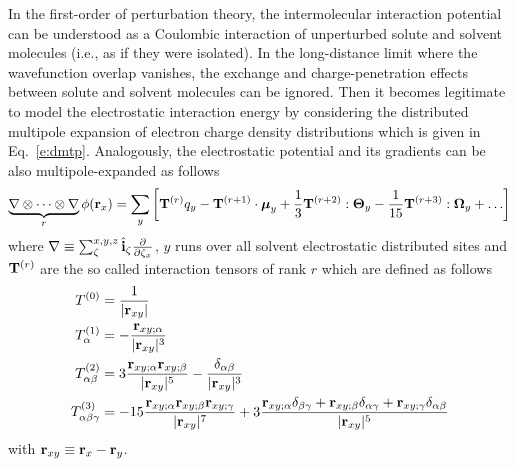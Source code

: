 \documentclass[a4paper,titlepage,twoside,fleqn,12pt]{book}
\newcommand{\BM}[1]{\ensuremath{\mbox{\boldmath${#1}$}}}
\begin{document}
\begin{refsection}
In the first\hyp{}order of perturbation
theory, the intermolecular interaction potential
can be understood as a Coulombic interaction
of unperturbed solute and solvent molecules (i.e., 
as if they were isolated).\citep{Jeziorski.Moszynski.Szalewicz.ChemRev.1994,Stone.TheTheoryOfIntermolecularForces.1996}
In the long\hyp{}distance limit where the wavefunction overlap vanishes, the
exchange and charge\hyp{}penetration effects 
between solute and solvent molecules can be ignored.
Then it becomes legitimate to model the electrostatic interaction
energy by considering the distributed multipole expansion of electron
charge density distributions\citep{Stone.TheTheoryOfIntermolecularForces.1996}
which is given in Eq.~\eqref{e:dmtp}. Analogously,
the electrostatic potential and its gradients
can be also multipole\hyp{}expanded as follows
%
\begin{equation} \label{e:potential-gradients}
\underbrace{\nabla \otimes \cdots \otimes \nabla}_{r} \phi({\bf r}_x) = 
\sum_y \left[ 
{\bf T}^{(r)} q_y - {\bf T}^{(r+1)} \cdot {\BM \mu}_y + 
 \frac{1}{3} {\bf T}^{(r+2)} : {\BM \Theta}_y - 
\frac{1}{15} {\bf T}^{(r+3)} : {\BM \Omega}_y + \ldots
\right]
\end{equation}
%
where 
$\nabla \equiv \sum_{\zeta}^{x,y,z} \hat{\bf i}_\zeta \frac{\partial}{\partial \zeta_x}$, 
$y$ runs over all solvent electrostatic distributed sites
and ${\bf T}^{(r)}$ are the so called interaction tensors of rank $r$ which are defined as follows
%
\begin{subequations}
\label{e:interaction-tensors}
\begin{align}
  T^{(0)} &= \frac{1}{\rvert {\bf r}_{xy} \lvert}  \label{e:interaction-tensors-1} \\
  T^{(1)}_\alpha &=-\frac{{\bf r}_{xy;\alpha}}{\rvert {\bf r}_{xy} \lvert^3}  \label{e:interaction-tensors-2} \\
  T^{(2)}_{\alpha\beta} &=3\frac{{\bf r}_{xy;\alpha} {\bf r}_{xy;\beta} }{\rvert {\bf r}_{xy} \lvert^5}  
      - \frac{\delta_{\alpha\beta}}{\rvert {\bf r}_{xy} \lvert^3}             \label{e:interaction-tensors-3} \\
  T^{(3)}_{\alpha\beta\gamma} &= -15 
         \frac{{\bf r}_{xy;\alpha} {\bf r}_{xy;\beta} {\bf r}_{xy;\gamma} }{\rvert {\bf r}_{xy} \lvert^7}
                  +3 \frac{{\bf r}_{xy;\alpha} \delta_{\beta\gamma}+
                           {\bf r}_{xy;\beta}  \delta_{\alpha\gamma}+
                           {\bf r}_{xy;\gamma} \delta_{\alpha\beta}}{\rvert {\bf r}_{xy} \lvert^5} \label{e:interaction-tensors-4}
\end{align}
\end{subequations}
%
with ${\bf r}_{xy} \equiv {\bf r}_x - {\bf r}_y$.


\end{refsection}
\end{document}
